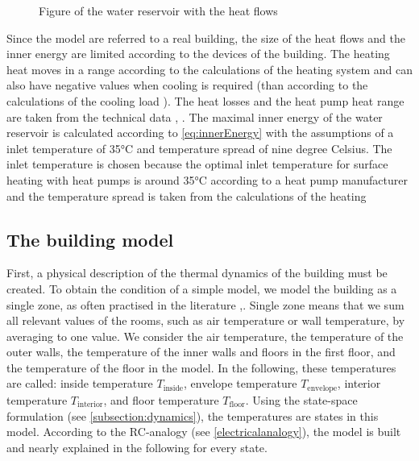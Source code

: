     \begin{figure}
        \centering
        \def\svgwidth{120pt}
        
        \caption{Figure of the water reservoir with the heat flows}
        \label{fig:Figure of the water reservoir with the heat flows}
    \end{figure}
    
    Since the model are referred to a real building, the size of the heat flows and the inner energy are limited according to the devices of the building. The heating heat moves in a range according to the calculations of the heating system \cite{Roth_Auslegung.2020} and can also have negative values when cooling is required (than according to the calculations of the cooling load \cite{SEFIngenieurgesellschaftMBH.2019}). The heat losses and the heat pump heat range are taken from the technical data \cite{Oskar}, \cite{TUM}.
    The maximal inner energy of the water reservoir is calculated according to \autoref{eq:innerEnergy} with the assumptions of a inlet temperature of 35°C and temperature spread of nine degree Celsius. The inlet temperature is chosen because the optimal inlet temperature for surface heating with heat pumps is around 35°C according to a heat pump manufacturer \cite{} and the temperature spread is taken from the calculations of the heating 

    \subsection{The building model}
    \label{building model}
    First, a physical description of the thermal dynamics of the building must be created. To obtain the condition of a simple model, we model the building as a single zone, as often practised in the literature \cite{Park.2011},\cite{Hazyuk.2012}. Single zone means that we sum all relevant values of the rooms, such as air temperature or wall temperature, by averaging to one value. 
    \newline
    We consider the air temperature, the temperature of the outer walls, the temperature of the inner walls and floors in the first floor, and the temperature of the floor in the model. In the following, these temperatures are called: inside temperature  $T_\text{inside}$, envelope temperature $T_\text{envelope}$, interior temperature $T_\text{interior}$, and floor temperature $T_\text{floor}$. 
    Using the state-space formulation (see \autoref{subsection:dynamics}), the temperatures are states in this model. According to the RC-analogy (see \autoref{electricalanalogy}), the model is built and nearly explained in the following for every state. \newline
    
